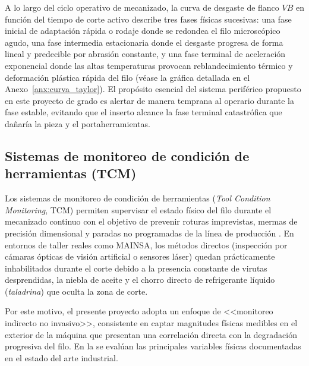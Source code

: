 A lo largo del ciclo operativo de mecanizado, la curva de desgaste de flanco $VB$ en función del tiempo de corte activo describe tres fases físicas sucesivas: una fase inicial de adaptación rápida o rodaje donde se redondea el filo microscópico agudo, una fase intermedia estacionaria donde el desgaste progresa de forma lineal y predecible por abrasión constante, y una fase terminal de aceleración exponencial donde las altas temperaturas provocan reblandecimiento térmico y deformación plástica rápida del filo (véase la gráfica detallada en el Anexo~\ref{anx:curva_taylor}). El propósito esencial del sistema periférico propuesto en este proyecto de grado es alertar de manera temprana al operario durante la fase estable, evitando que el inserto alcance la fase terminal catastrófica que dañaría la pieza y el portaherramientas.


\subsection{Sistemas de monitoreo de condición de herramientas (TCM)}
\label{subsec:sistemas_tcm}

Los sistemas de monitoreo de condición de herramientas (\textit{Tool Condition Monitoring}, TCM) permiten supervisar el estado físico del filo durante el mecanizado continuo con el objetivo de prevenir roturas imprevistas, mermas de precisión dimensional y paradas no programadas de la línea de producción \citep{byrne1995, teti2010}. En entornos de taller reales como MAINSA, los métodos directos (inspección por cámaras ópticas de visión artificial o sensores láser) quedan prácticamente inhabilitados durante el corte debido a la presencia constante de virutas desprendidas, la niebla de aceite y el chorro directo de refrigerante líquido (\textit{taladrina}) que oculta la zona de corte.

Por este motivo, el presente proyecto adopta un enfoque de <<monitoreo indirecto no invasivo>>, consistente en captar magnitudes físicas medibles en el exterior de la máquina que presentan una correlación directa con la degradación progresiva del filo. En la  se evalúan las principales variables físicas documentadas en el estado del arte industrial.


